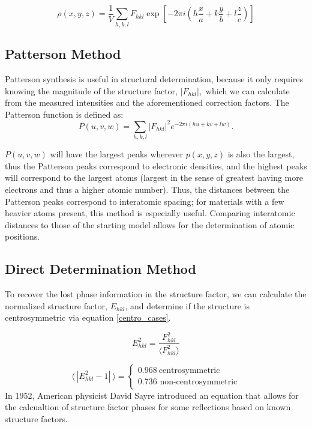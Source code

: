\documentclass[]{scrartcl}
\begin{document}
\begin{equation}\label{rho}
\rho(x,y,z) = \frac{1}{V} \sum_{h,k,l} F_{hkl} \exp \left[-2 \pi i \left( h\frac{x}{a}+k\frac{y}{b}+l\frac{z}{c}\right) \right]
\end{equation}

\subsection{Patterson Method}
Patterson synthesis is useful in structural determination, because it only requires knowing the magnitude of the structure factor, $ |F_{hkl}|, $ which we can calculate from the measured intensities and the aforementioned correction factors. The Patterson function is defined as: \begin{equation}\label{Patt}
P(u,v,w) = \sum_{h,k,l}|F_{hkl}|^2 e^{-2\pi i(hu+kv+lw)} \textrm{.}
\end{equation}

$ P(u,v,w) $ will have the largest peaks wherever $ p(x,y,z) $ is also the largest, thus the Patterson peaks correspond to electronic densities, and the highest peaks will correspond to the largest atoms (largest in the sense of greatest having more electrons and thus a higher atomic number). Thus, the distances between the Patterson peaks correspond to interatomic spacing; for materials with a few heavier atoms present, this method is especially useful. Comparing interatomic distances to those of the starting model allows for the determination of atomic positions. 

\subsection{Direct Determination Method}
To recover the lost phase information in the structure factor, we can calculate the normalized structure factor, $ E_{hkl} $, and determine if the structure is centrosymmetric via equation \ref{centro_cases}. 

\begin{equation}\label{scale}
E^2_{hkl} = \frac{F^2_{hkl}}{\langle F^2_{hkl} \rangle}
\end{equation}

\begin{equation}\label{centro_cases}
{\langle \ | E_{hkl}^2-1 | \ \rangle} = \begin{cases}0.968~\textrm{centrosymmetric}\\0.736 \textrm{~non-centrosymmetric}\end{cases}
\end{equation}
In 1952, American physicist David Sayre introduced an equation that allows for the calcualtion of structure factor phases for some reflections based on known structure factors. 
\end{document}
